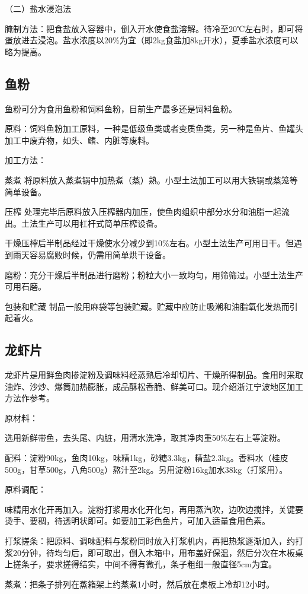\documentclass{ctexbook}
\begin{document}
（二）盐水浸泡法

腌制方法：把食盐放入容器中，倒入开水使食盐溶解。待冷至20℃左右时，即可将蛋放进去浸泡。盐水浓度以20\%为宜（即2kg食盐加8kg开水），夏季盐水浓度可以略为提高。
\subsection{鱼粉}
鱼粉可分为食用鱼粉和饲料鱼粉，目前生产最多还是饲料鱼粉。

原料：饲料鱼粉加工原料，一种是低级鱼类或者变质鱼类，另一种是鱼片、鱼罐头加工中废弃物，如头、鳍、内脏等废料。

加工方法：

蒸煮 将原料放入蒸煮锅中加热煮（蒸）熟。小型土法加工可以用大铁锅或蒸笼等简单设备。

压榨 处理完毕后原料放入压榨器内加压，使鱼肉组织中部分水分和油脂一起流出。土法生产可以用杠杆式简单压榨设备。

干燥压榨后半制品经过干燥使水分减少到10\%左右。小型土法生产可用日干。但遇到雨天容易腐败时候，仍需用简单烘干设备。

磨粉：充分干燥后半制品进行磨粉；粉粒大小一致均匀，用筛筛过。小型土法生产可用石磨。

包装和贮藏 制品一般用麻袋等包装贮藏。贮藏中应防止吸潮和油脂氧化发热而引起着火。
\subsection{龙虾片}
龙虾片是用鲜鱼肉掺淀粉及调味料经蒸熟后冷却切片、干燥所得制品。食用时采取油炸、沙炒、爆筒加热膨胀，成品酥松香脆、鲜美可口。现介绍浙江宁波地区加工方法作参考。

原材料：

选用新鲜带鱼，去头尾、内脏，用清水洗净，取其净肉重50\%左右上等淀粉。

配料：淀粉90kg，鱼肉10kg，味精1kg，砂糖3.3kg，精盐2.3kg。香料水（桂皮500g，甘草500g，八角500g）熬汁至2kg。另用淀粉16kg加水38kg（打浆用）。

原料调配：

味精用水化开再加入。淀粉打浆用水化开化匀，再用蒸汽吹，边吹边搅拌，关键要烫手、要稠，待透明状即可。如要加工彩色鱼片，可加入适量食用色素。

打浆搓条：把原料、调味配料与浆粉同时放入打浆机内，再把热浆逐渐加入，约打浆20分钟，待均匀后，即可取出，倒入木箱中，用布盖好保温，然后分次在木板桌上搓条子，要求搓得结实，中间不得有微孔，条子粗细一般直径5cm为宜。

蒸煮：把条子排列在蒸箱架上约蒸煮1小时，然后放在桌板上冷却12小时。
\end{document}
